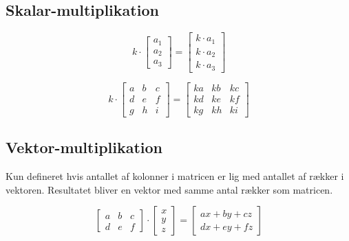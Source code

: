 \subsection{Skalar-multiplikation}
\begin{minipage}{0.25\textwidth}
    \[
        k \cdot
        \begin{bmatrix}
            a_{1} \\
            a_{2} \\
            a_{3}
        \end{bmatrix}
        =
        \begin{bmatrix}
            k \cdot a_{1} \\
            k \cdot a_{2} \\
            k \cdot a_{3}
        \end{bmatrix}
    \]
\end{minipage}
\hfill
\begin{minipage}{0.55\textwidth}
    \[
        k \cdot
        \begin{bmatrix}
            a & b & c \\
            d & e & f \\
            g & h & i
        \end{bmatrix}
        =
        \begin{bmatrix}
            k a & k b & k c \\
            k d & k e & k f \\
            k g & k h & k i
        \end{bmatrix}
    \]
\end{minipage}


\subsection{Vektor-multiplikation}
Kun defineret hvis antallet af kolonner i matricen er lig med antallet af rækker i vektoren. Resultatet bliver en vektor med samme antal rækker som matricen.

\[
    \begin{bmatrix}
        a & b & c \\
        d & e & f
    \end{bmatrix}
    \cdot
    \begin{bmatrix}
        x \\
        y \\
        z
    \end{bmatrix}
    =
    \begin{bmatrix}
        ax + by + cz \\
        dx + ey + fz
    \end{bmatrix}
\]

